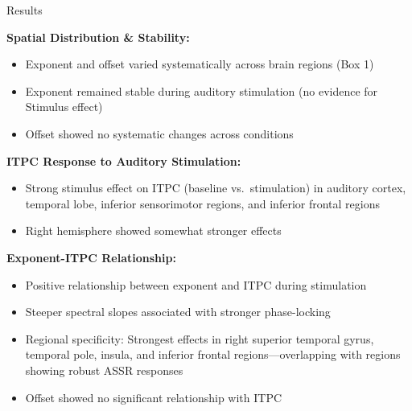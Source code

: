 \documentclass{beamer}
\begin{document}
\begin{frame}[t]
\begin{textblock*}{\colwidth}
	
			
		
\begin{block}{Results}
	\vspace{-0.333333\baselineskip}
	
	\textbf{Spatial Distribution \& Stability:}
	\begin{itemize}
		\item Exponent and offset varied systematically across brain regions (Box 1)
		\item Exponent remained stable during auditory stimulation (no evidence for Stimulus effect)
		\item Offset showed no systematic changes across conditions
	\end{itemize}
	
	\textbf{ITPC Response to Auditory Stimulation:}
	\begin{itemize}
		\item Strong stimulus effect on ITPC (baseline vs.\ stimulation) in auditory cortex, temporal lobe, inferior sensorimotor regions, and inferior frontal regions
		\item Right hemisphere showed somewhat stronger effects
	\end{itemize}
	
	\textbf{Exponent-ITPC Relationship:}
	\begin{itemize}
		\item Positive relationship between exponent and ITPC during stimulation 
		\item Steeper spectral slopes associated with stronger phase-locking
		\item Regional specificity: Strongest effects in right superior temporal gyrus, temporal pole, insula, and inferior frontal regions---overlapping with regions showing robust ASSR responses
		\item Offset showed no significant relationship with ITPC
	\end{itemize}
	

\end{block}
\end{textblock*}
\end{frame}
\end{document}
